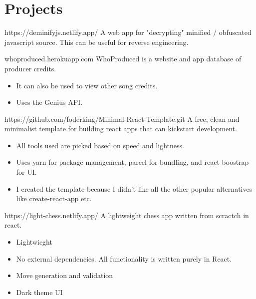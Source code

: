 \section{Projects}
\begin{experience}{https://deminifyjs.netlify.app/}{
}
A web app for "decrypting" minified / obfuscated javascript source.
This can be useful for reverse engineering.
\end{experience}

\begin{experience}{whoproduced.herokuapp.com}{
}
WhoProduced is a website and app database of producer credits.

\begin{itemize}
	\item It can also be used to view other song credits.
	\item Uses the Genius API.
\end{itemize}

\end{experience}

\begin{experience}{https://github.com/foderking/Minimal-React-Template.git}{
}
A free, clean and minimalist template for building react apps that can kickstart development.

\begin{itemize}
	\item All tools used are picked based on speed and lightness.
	\item Uses yarn for package management, parcel for bundling, and react boostrap for UI.
	\item I created the template because I didn't like all the other popular alternatives like create-react-app etc.
\end{itemize}

\end{experience}


\begin{experience}[last]{https://light-chess.netlify.app/}{
}
A lightweight chess app written from scractch in react.

\begin{itemize}
 	\item Lightwieght
 	\item No external dependencies. All functionality is written purely in React.
 	\item Move generation and validation
 	\item Dark theme UI
\end{itemize}

\end{experience}


